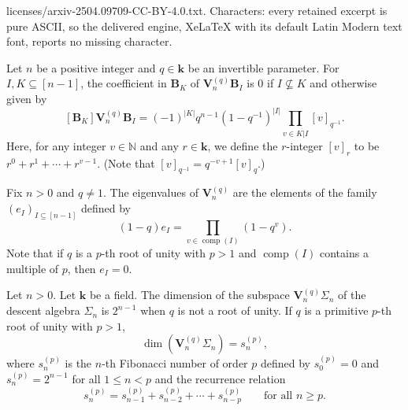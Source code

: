 \documentclass[10pt,a4paper]{amsart}
\newcommand{\NN}{\mathbb{N}} %
\newcommand{\comp}{\operatorname{comp}}
\newcommand{\kk}{\mathbf{k}} %
\begin{document}
licenses/arxiv-2504.09709-CC-BY-4.0.txt. Characters: every retained excerpt is pure ASCII, so the delivered engine, XeLaTeX with its default Latin Modern text font, reports no missing character.
\begin{theorem}
\label{thm.vnq}
Let $n$ be a positive integer and $q \in \mathbf{k}$ be an invertible parameter.
For $I, K \subseteq [n-1]$, the coefficient in $\mathbf{B}_K$ of $\mathbf{V}^{(q)}_n\mathbf{B}_I$ is $0$ if $I \nsubseteq K$ and otherwise given by
\begin{equation}
\label{equation.thm.vnq}
[\mathbf{B}_K]\mathbf{V}^{(q)}_n\mathbf{B}_I
= (-1)^{|K|} q^{n-1} (1-q^{-1})^{|I|} \prod_{v \in \overline{ K|I}}[v]_{q^{-1}}.
\end{equation}
Here, for any integer $v \in \NN$ and any $r \in \kk$, we define the $r$-integer $[v]_r$ to be $r^0 + r^1 + \cdots + r^{v-1}$. (Note that $[v]_{q^{-1}} = q^{-v+1} [v]_q$.)
\end{theorem}

\begin{corollary}
\label{corollary.eigen}
Fix $n>0$ and $q\neq 1$. The eigenvalues of $\mathbf{V}_n^{(q)}$ are the elements of the family $(e_I)_{I \subseteq [n-1]}$ defined by
\begin{equation}
 (1-q)e_I = \prod_{v \in \comp(I)} (1-q^v).
\end{equation}
Note that if $q$ is a $p$-th root of unity with $p>1$ and $\comp(I)$ contains a multiple of $p$, then $e_I = 0$. 
\end{corollary}

\begin{corollary}
\label{corollary.rank}
Let $n>0$. Let $\mathbf{k}$ be a field. The dimension of the subspace $\mathbf{V}_n^{(q)}\Sigma_n$ of the descent algebra $\Sigma_n$ is $2^{n-1}$ when $q$ is not a root of unity.
If $q$ is a primitive $p$-th root of unity with $p>1$,
\begin{equation}
\dim\left(\mathbf{V}_n^{(q)}\Sigma_n\right) = s_n^{(p)},
\end{equation}
where $s_n^{(p)}$ is the $n$-th Fibonacci number of order $p$ defined by $s_0^{(p)} = 0$ and $s_n^{(p)} = 2^{n-1}$ for all $1 \leq n < p$ and the recurrence relation
%
\begin{equation*}
s^{(p)}_n = 
s^{(p)}_{n-1} + s^{(p)}_{n-2} + \cdots + s^{(p)}_{n-p} %
\qquad \text{for all } n \geq p.
\end{equation*}
%
\end{corollary}
\end{document}

